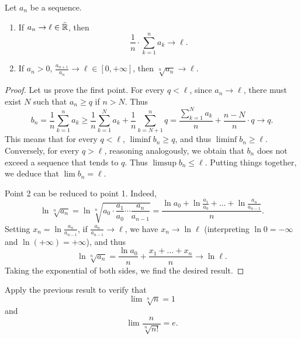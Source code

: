 \begin{theorem}
  \label{th:criterio_cesaro}%
  \mymark{*}%
%
  Let $a_n$ be a sequence.
  \begin{enumerate}
  \item
    If
    $   a_n \to \ell \in \bar {{\mathbb R}}$,
    then
    \[
    \frac 1 n \cdot \displaystyle\sum_{k=1}^n a_k \to \ell.
    \]
  
  \item
    If $a_n>0$,
    $\displaystyle\frac{a_{n+1}}{a_n} \to \ell \in [0,+\infty]$,
    then
    $\displaystyle \sqrt[n]{a_n}\to \ell$.
  \end{enumerate}
  \end{theorem}
  \begin{proof}
  Let us prove the first point.
  For every $q<\ell$, since $a_n\to \ell$, there must exist $N$ such that 
  $a_n\ge q$ if $n> N$. 
  Thus 
  \[
    b_n = \frac 1 n \sum_{k=1}^{n} a_k 
    \ge \frac 1 n \sum_{k=1}^N a_k + \frac 1 n \sum_{k=N+1}^n q 
    = \frac{\sum_{k=1}^N a_k}{n} + \frac{n-N}{n}\cdot q \to q.
  \]
  This means that for every $q<\ell$, $\liminf b_n \ge q$, and 
  thus $\liminf b_n \ge \ell$.
  Conversely, for every $q>\ell$, reasoning analogously, we obtain 
  that $b_n$ does not exceed a sequence that tends to $q$.
  Thus $\limsup b_n\le \ell$. 
  Putting things together, we deduce that $\lim b_n = \ell$.
    
  Point 2 can be reduced to point 1.
  Indeed,
  \[
    \ln \sqrt[n]{a_n}
    = \ln \sqrt[n]{a_0\cdot \frac{a_1}{a_0} \cdots \frac{a_n}{a_{n-1}}}
    = \frac{\ln a_0 + \ln \frac{a_1}{a_0} + \dots + \ln \frac{a_n}{a_{n-1}}}{n}.
  \]
  Setting $x_n = \ln \frac{a_n}{a_{n-1}}$,
  if $\frac{a_n}{a_{n-1}}\to \ell$,
    we have $x_n\to \ln \ell$ (interpreting $\ln 0 = -\infty$ and $\ln
  (+\infty)=+\infty$), and thus
  \[
    \ln \sqrt[n]{a_n} = \frac{\ln a_0}{n} + \frac{x_1 + \dots + x_n}{n}
    \to \ln \ell.
  \]
  Taking the exponential of both sides, we find the desired result.
  \end{proof}
  
  \begin{exercise}\label{ex:7340098}
  Apply the previous result to
  verify that
  \[
     \lim \sqrt[n]{n} = 1
  \]
 and
 \[
   \lim \frac{n}{\sqrt[n]{n!}} = e.
 \]
 \end{exercise}

